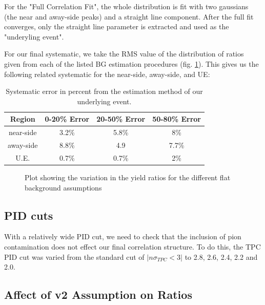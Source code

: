 \documentclass[ALICE,manyauthors]{ALICE_analysis_notes}
\begin{document}
\begin{itemize}
For the "Full Correlation Fit", the whole distribution is fit with two gaussians (the near and away-side peaks) and a straight line component.  After the full fit converges, only the straight line parameter is extracted and used as the "underyling event".

For our final systematic, we take the RMS value of the distribution of ratios given from each of the listed BG estimation procedures (fig. \ref{uesyst}). This gives us the following related systematic for the near-side, away-side, and UE:

\begin{table}[h!]
    \centering
\begin{tabular}{| c | c | c | c |}
\hline
Region & 0-20\% Error & 20-50\% Error & 50-80\% Error \\
\hline
near-side & 3.2\% & 5.8\% & 8\% \\
away-side & 8.8\% & 4.9 & 7.7\% \\
U.E. & 0.7\% & 0.7\% & 2\% \\
\hline
\end{tabular}
\caption{Systematic error in percent from the estimation method of our underlying event.}
\label{evttab}
\end{table}

\begin{figure}[ht]
\centering
\begin{subfigure}{
\texttt{[image: images/nearside\_uesyst.pdf]}}
\end{subfigure}
\begin{subfigure}{
\texttt{[image: images/awayside\_uesyst.pdf]}}
\end{subfigure}
\caption{Plot showing the variation in the yield ratios for the different flat background assumptions}
\label{uesyst}
\end{figure}

\subsection{PID cuts}
\label{PIDcuts}

With a relatively wide PID cut, we need to check that the inclusion of pion contamination does not effect our final correlation structure.  To do this, the TPC PID cut was varied from the standard cut of $|n\sigma_{TPC} < 3|$ to 2.8, 2.6, 2.4, 2.2 and 2.0.

\subsection{Affect of v2 Assumption on Ratios}


\end{itemize}
\end{document}
